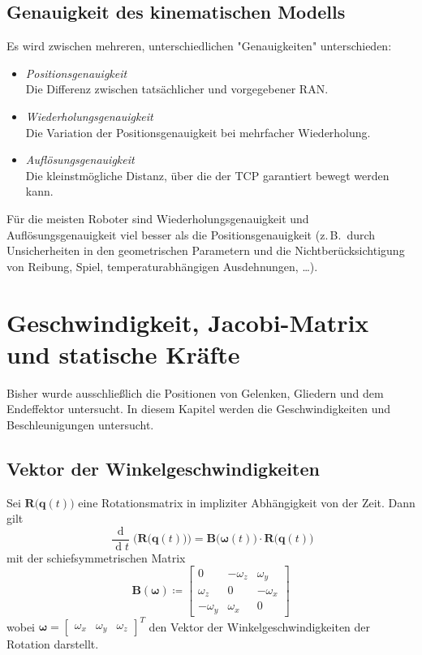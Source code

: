 \documentclass[a4paper, 11pt, accentcolor = tud3b]{tudreport}
\DeclareMathOperator{\total}{d}
\newcommand{\mat}[1]{\boldsymbol{#1}}
\renewcommand{\vec}[1]{\boldsymbol{#1}}
\newcommand{\zB}{z.\,B.~}
\begin{document}
		\section{Genauigkeit des kinematischen Modells}
			Es wird zwischen mehreren, unterschiedlichen "Genauigkeiten" unterschieden:
			\begin{itemize}
				\item \emph{Positionsgenauigkeit} \\ Die Differenz zwischen tatsächlicher und vorgegebener RAN.
				\item \emph{Wiederholungsgenauigkeit} \\ Die Variation der Positionsgenauigkeit bei mehrfacher Wiederholung.
				\item \emph{Auflösungsgenauigkeit} \\ Die kleinstmögliche Distanz, über die der TCP garantiert bewegt werden kann.
			\end{itemize}
			Für die meisten Roboter sind Wiederholungsgenauigkeit und Auflösungsgenauigkeit viel besser als die Positionsgenauigkeit (\zB durch Unsicherheiten in den geometrischen Parametern und die Nichtberücksichtigung von Reibung, Spiel, temperaturabhängigen Ausdehnungen, \dots).

	\chapter{Geschwindigkeit, Jacobi-Matrix und statische Kräfte}
		Bisher wurde ausschließlich die Positionen von Gelenken, Gliedern und dem Endeffektor untersucht. In diesem Kapitel werden die Geschwindigkeiten und Beschleunigungen untersucht.

		\section{Vektor der Winkelgeschwindigkeiten}
			Sei \( \mat{R}\big(\!\vec{q}(t)\big) \) eine Rotationsmatrix in impliziter Abhängigkeit von der Zeit. Dann gilt
			\begin{equation*}
				\frac{\total}{\total t} \Big(\!\mat{R}\big(\vec{q}(t)\big)\Big) = \mat{B}\big(\!\vec{\omega}(t)\big) \cdot \mat{R}\big(\vec{q}(t)\big)
			\end{equation*}
			mit der schiefsymmetrischen Matrix
			\begin{equation*}
				\mat{B}(\vec{\omega}) \coloneqq
					\begin{bmatrix}
						0         & -\omega_z & \omega_y  \\
						\omega_z  & 0         & -\omega_x \\
						-\omega_y & \omega_x  & 0
					\end{bmatrix}
			\end{equation*}
			wobei \( \vec{\omega} = \begin{bmatrix} \omega_x & \omega_y & \omega_z \end{bmatrix}^T \) den Vektor der Winkelgeschwindigkeiten der Rotation darstellt.
			
\end{document}
